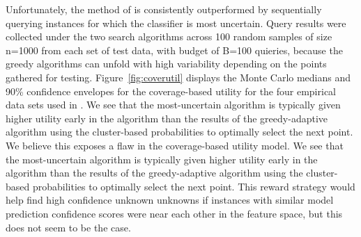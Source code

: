 \documentclass[letterpaper]{article} %
\begin{document}
Unfortunately, the method of \citet{Bansal2018} is consistently outperformed by sequentially querying instances for which the classifier is most uncertain. Query results were collected under the two search algorithms across 100 random samples of size n=1000 from each set of test data, with budget of B=100 quieries, because the greedy algorithms can unfold with high variability depending on the points gathered for testing. Figure~\ref{fig:coverutil} displays the Monte Carlo medians and 90\% confidence envelopes for the coverage-based utility for the four empirical data sets used in \citet{Bansal2018}. We see that the most-uncertain algorithm is typically given higher utility early in the algorithm than the results of the greedy-adaptive algorithm using the cluster-based probabilities to optimally select the next point.  We believe this exposes a flaw in the coverage-based utility model.  We see that the most-uncertain algorithm is typically given higher utility early in the algorithm than the results of the greedy-adaptive algorithm using the cluster-based probabilities to optimally select the next point. This reward strategy would help find high confidence unknown unknowns if instances with similar model prediction confidence scores were near each other in the feature space, but this does not seem to be the case.
\end{document}
